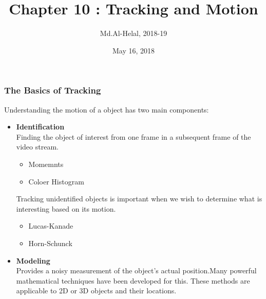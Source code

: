 \documentclass[usenames,dvipsnames]{beamer}
\begin{document}
\author{Md.Al-Helal, 2018-19}
\title{Chapter 10 : Tracking and Motion}
\date{May 16, 2018}
\begin{frame}
  \maketitle
\end{frame}
\begin{frame}
\frametitle{The Basics of Tracking}
Understanding the motion of a object has two main components:
\begin{itemize}
\item \textbf{Identification}\\
Finding the object of interest from one frame in a subsequent
frame of the video stream.
\begin{itemize}
\item Momemnts
\item Coloer Histogram
\end{itemize}
Tracking unidentified objects is important when we wish to determine what is interesting based on its motion.
\begin{itemize}
\item Lucas-Kanade
\item Horn-Schunck
\end{itemize}
\item \textbf{Modeling}\\
Provides a noisy measurement of the object’s actual position.Many
powerful mathematical techniques have been developed for this. These methods are applicable to 2D or 3D objects and their locations.
\end{itemize}
\end{frame}
\end{document}
